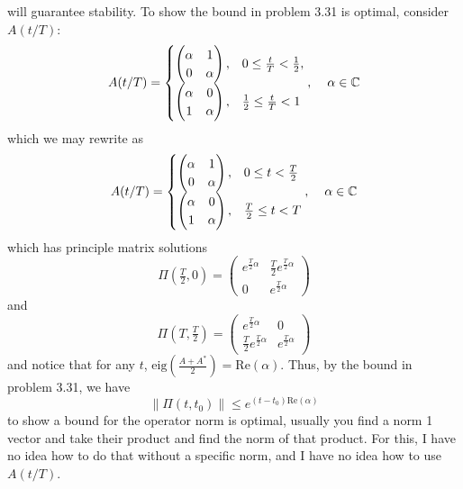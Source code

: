 \documentclass{article}
\begin{document}
\begin{itemize}
    will guarantee stability. To show the bound in problem 3.31 is optimal, consider $A(t/T):$
    \[A(t/T) = \begin{cases}
        \begin{pmatrix}
            \alpha & 1\\
            0 & \alpha
        \end{pmatrix}, & 0 \leq \frac{t}{T} < \frac{1}{2},\\
        \begin{pmatrix}
            \alpha & 0\\
            1 & \alpha
        \end{pmatrix}, & \frac{1}{2} \leq \frac{t}{T} < 1
    \end{cases}, \hspace{0.4cm} \alpha \in \mathbb{C}\]
    which we may rewrite as
    \[A(t/T) = \begin{cases}
        \begin{pmatrix}
            \alpha & 1\\
            0 & \alpha
        \end{pmatrix}, & 0\leq t < \frac{T}{2}\\
        \begin{pmatrix}
            \alpha & 0\\
            1 & \alpha
        \end{pmatrix}, & \frac{T}{2} \leq t < T
    \end{cases}, \hspace{0.4cm} \alpha \in \mathbb{C}\]
    which has principle matrix solutions
    \[\Pi(\tfrac{T}{2},0) = \begin{pmatrix}
        e^{\tfrac{T}{2}\alpha} & \tfrac{T}{2}e^{\tfrac{T}{2}\alpha}\\
        0 & e^{\frac{T}{2}\alpha}  
    \end{pmatrix}\]
    and
    \[\Pi(T,\tfrac{T}{2}) = \begin{pmatrix}
        e^{\tfrac{T}{2}\alpha} & 0\\
        \tfrac{T}{2}e^{\tfrac{T}{2}\alpha} & e^{\tfrac{T}{2}\alpha}
    \end{pmatrix}\]
    and notice that for any $t$, $\text{eig}\left(\frac{A + A^*}{2}\right) = \text{Re}(\alpha)$. Thus, by the bound in problem 3.31, we have
    \[\|\Pi(t,t_0)\| \leq e^{(t - t_0)\text{Re}(\alpha)}\]
    to show a bound for the operator norm is optimal, usually you find a norm 1 vector and take their product and find the norm of that product. For this, I have no idea how to do that without a specific norm, and I have no idea how to use $A(t/T)$.
    


\end{itemize}
\end{document}
